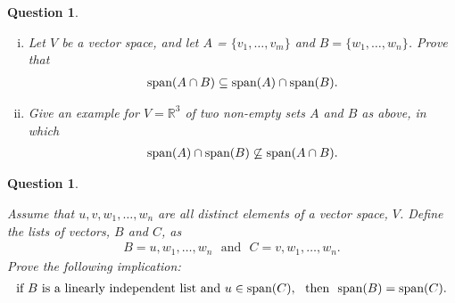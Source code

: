 \documentclass[12pt]{article}
\newtheorem{question}[thm]{Question}
\def\real{{\mathbb R}}
\def\SpanLA{\textnormal{span}}
\newcommand{\intersect}{\cap}
\begin{document}
\begin{question}\label{que:SpanIntersection}
    \normalfont

    \begin{enumerate}[(i)]
        \item Let $V$ be a vector space, and let $A$ = $\{v_1,\dots, v_m\}$ and $B=\{ w_1, \dots, w_n\}$.  Prove that
              \begin{align*}
                  \SpanLA(A\intersect B) \subseteq \SpanLA(A)\intersect\SpanLA(B).
              \end{align*}


        \item Give an example for $V=\real^3$ of two \emph{non-empty} sets $A$ and $B$ as above, in which
              \begin{align*}
                  \SpanLA(A)\intersect \SpanLA(B) \not\subseteq \SpanLA(A\intersect B).
              \end{align*}


    \end{enumerate}
\end{question}

\vspace{1cm}

\begin{question}\label{que:SpanAgain}
    \normalfont

    Assume that  $u,v,w_1,\dots,w_n$ are all distinct elements of a vector space, $V$.  Define the lists of vectors, $B$ and $C$, as
    \begin{align*}
        B =  u, w_1,\dots, w_n \ \ \ \text{and}\ \ \
        C =  v, w_1,\dots, w_n .
    \end{align*}
    Prove the following implication:
    \begin{align*}
        \text{if}\ B\ \text{is a linearly independent list and}\  u\in\SpanLA(C),\ \ \text{then}\ \ \SpanLA(B)=\SpanLA(C).
    \end{align*}
\end{question}

\vspace{1cm}



\vspace{.5cm}
\end{document}
